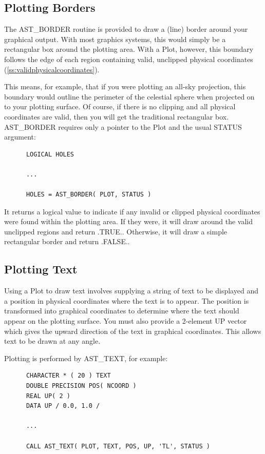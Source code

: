 \documentclass[twoside,11pt]{article}
\newcommand{\htmlref}[2]{#1}
\newcommand{\secref}[1]{\S\ref{#1}}
\renewcommand{\secref}[1]{\ref{#1}}
\begin{document}
\subsection{Plotting Borders}

The \htmlref{AST\_BORDER}{AST_BORDER} routine is provided to draw a (line) border around
your graphical output. With most graphics systems, this would simply
be a rectangular box around the plotting area. With a \htmlref{Plot}{Plot}, however,
this boundary follows the edge of each region containing valid,
unclipped physical coordinates (\secref{ss:validphysicalcoordinates}).

This means, for example, that if you were plotting an all-sky
projection, this boundary would outline the perimeter of the celestial
sphere when projected on to your plotting surface. Of course, if there
is no clipping and all physical coordinates are valid, then you will
get the traditional rectangular box. AST\_BORDER requires only a
pointer to the Plot and the usual STATUS argument:

\small
\begin{verbatim}
      LOGICAL HOLES

      ...

      HOLES = AST_BORDER( PLOT, STATUS )
\end{verbatim}
\normalsize

It returns a logical value to indicate if any invalid or clipped
physical coordinates were found within the plotting area. If they
were, it will draw around the valid unclipped regions and return
.TRUE.. Otherwise, it will draw a simple rectangular border and return
.FALSE..

\subsection{Plotting Text}

Using a \htmlref{Plot}{Plot} to draw text involves supplying a string of text to be
displayed and a position in physical coordinates where the text is to
appear. The position is transformed into graphical coordinates to
determine where the text should appear on the plotting surface. You
must also provide a 2-element UP vector which gives the upward
direction of the text in graphical coordinates. This allows text to be
drawn at any angle.

Plotting is performed by \htmlref{AST\_TEXT}{AST_TEXT}, for example:

\small
\begin{verbatim}
      CHARACTER * ( 20 ) TEXT
      DOUBLE PRECISION POS( NCOORD )
      REAL UP( 2 )
      DATA UP / 0.0, 1.0 /

      ...

      CALL AST_TEXT( PLOT, TEXT, POS, UP, 'TL', STATUS )
\end{verbatim}
\normalsize
\end{document}
